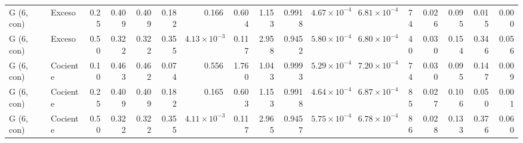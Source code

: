 \documentclass[11pt,letterpaper]{article}
\begin{document}
\begin{landscape}
\begin{scriptsize}
\begin{longtable}{llrrrrrrrrrrrrrrr}
G (6, con) & Exceso & 0.25 & 0.409 & 0.409 & 0.182 & 0.166 & 0.604 & 1.153 & 0.9918 & $4.67\times10^{-4}$ & $6.81\times10^{-4}$ & 74 & 0.026 & 0.095 & 0.015 & 0.000 \\
G (6, con) & Exceso & 0.50 & 0.322 & 0.322 & 0.355 & $4.13\times10^{-3}$ & 0.117 & 2.958 & 0.9452 & $5.80\times10^{-4}$ & $6.80\times10^{-4}$ & 40 & 0.030 & 0.154 & 0.346 & 0.056 \\
G (6, con) & Cociente & 0.10 & 0.463 & 0.462 & 0.074 & 0.556 & 1.760 & 1.043 & 0.9993 & $5.29\times10^{-4}$ & $7.20\times10^{-4}$ & 74 & 0.030 & 0.095 & 0.147 & 0.009 \\
G (6, con) & Cociente & 0.25 & 0.409 & 0.409 & 0.182 & 0.165 & 0.603 & 1.153 & 0.9918 & $4.64\times10^{-4}$ & $6.87\times10^{-4}$ & 85 & 0.027 & 0.106 & 0.050 & 0.001 \\
G (6, con) & Cociente & 0.50 & 0.322 & 0.322 & 0.355 & $4.11\times10^{-3}$ & 0.117 & 2.965 & 0.9457 & $5.75\times10^{-4}$ & $6.78\times10^{-4}$ & 86 & 0.028 & 0.133 & 0.376 & 0.060 \\
\end{longtable}
\end{scriptsize}
\end{landscape}
\end{document}
